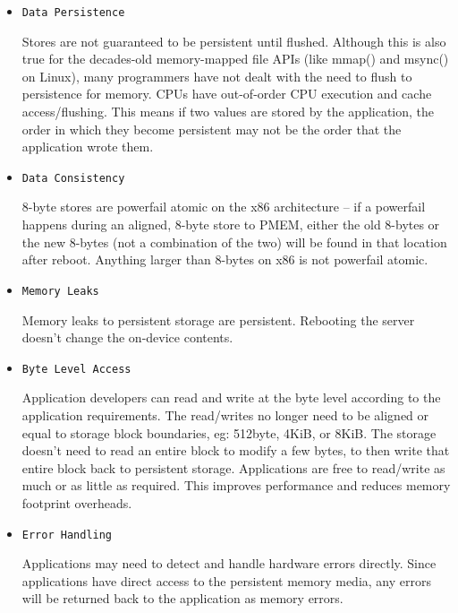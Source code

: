 \documentclass[11pt,swedish, openany, oneside]{book}
\begin{document}
\begin{itemize}
    \item \texttt{Data Persistence}

    Stores are not guaranteed to be persistent until flushed.  Although this is also true for the decades-old memory-mapped file APIs (like mmap() and msync() on Linux), many programmers have not dealt with the need to flush to persistence for memory. CPUs have out-of-order CPU execution and cache access/flushing.  This means if two values are stored by the application, the order in which they become persistent may not be the order that the application wrote them.  

    \item \texttt{Data Consistency}
    
    8-byte stores are powerfail atomic on the x86 architecture -- if a powerfail happens during an aligned, 8-byte store to PMEM, either the old 8-bytes or the new 8-bytes (not a combination of the two) will be found in that location after reboot.  
    Anything larger than 8-bytes on x86 is not powerfail atomic.
    
    \item \texttt{Memory Leaks} 

    Memory leaks to persistent storage are persistent.  Rebooting the server doesn't change the on-device contents.

    \item \texttt{Byte Level Access}

    Application developers can read and write at the byte level according to the application requirements. The read/writes no longer need to be aligned or equal to storage block boundaries, eg: 512byte, 4KiB, or 8KiB.  The storage doesn't need to read an entire block to modify a few bytes, to then write that entire block back to persistent storage.  Applications are free to read/write as much or as little as required.  This improves performance and reduces memory footprint overheads.

    \item \texttt{Error Handling}

    Applications may need to detect and handle hardware errors directly. Since applications have direct access to the persistent memory media, any errors will be returned back to the application as memory errors. 
\end{itemize}


\end{document}
